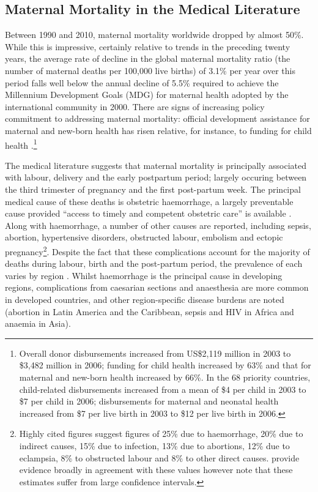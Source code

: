 \documentclass{article}[12pt,subeqn]
\begin{document}
\begin{spacing}{1.4}
\section{Maternal Mortality in the Medical Literature}
\label{scn:medliterature}
Between 1990 and 2010, maternal mortality worldwide dropped by almost 50\%. 
While this is impressive, certainly relative to trends in the preceding twenty 
years, the average rate of decline in the global maternal mortality ratio (the 
number of maternal deaths per 100,000 live births) of 3.1\% per year over this 
period falls well below the annual decline of 5.5\% required to achieve the 
Millennium Development Goals (MDG) for maternal health adopted by the 
international community in 2000. There are signs of increasing policy commitment 
to addressing maternal mortality: official development assistance for maternal 
and new-born health has risen relative, for instance, to funding for child 
health \citep{Grecoetal2008}.\footnote{Overall donor disbursements increased from 
US\$2,119 million in 2003 to \$3,482 million in 2006; funding for child
health increased by 63\% and that for maternal and new-born health increased by 
66\%. In the 68 priority countries, child-related disbursements increased from a 
mean of \$4 per child in 2003 to \$7 per child in 2006; disbursements for 
maternal and neonatal health increased from \$7 per live birth in 2003 to \$12 
per live birth in 2006.}

The medical literature suggests that maternal mortality is principally 
associated with labour, delivery and the early postpartum period; largely 
occuring between the third trimester of pregnancy and the first post-partum 
week. The principal medical cause of these deaths is obstetric haemorrhage, a 
largely preventable cause provided ``access to timely and competent obstetric 
care'' is available \citep{RonsmansGraham2006}.  Along with haemorrhage, a number 
of other causes are reported, including sepsis, abortion, hypertensive disorders, 
obstructed labour, embolism and ectopic pregnancy\footnote{Highly cited figures 
\citep{WHOetal1991} suggest figures of 25\% due to haemorrhage, 20\% due to 
indirect causes, 15\% due to infection, 13\% due to abortions, 12\% due to 
eclampsia, 8\% to obstructed labour and 8\% to other direct causes. 
\citet{Khanetal2006} provide evidence broadly in agreement with these values 
however note that these estimates suffer from large confidence intervals.}.  
Despite the fact that these complications account for the majority of deaths 
during labour, birth and the post-partum period, the prevalence of each varies 
by region \citep{Khanetal2006}.  Whilst haemorrhage is the principal cause in 
developing regions, complications from caesarian sections and anaesthesia are more 
common in developed countries, and other region-specific disease burdens are noted 
(abortion in Latin America and the Caribbean, sepsis and HIV in Africa and anaemia 
in Asia).


\end{spacing}
\end{document}
